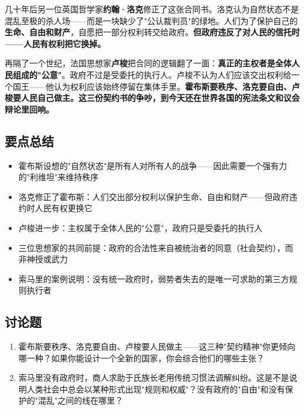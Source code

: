 \documentclass[a4paper,12pt]{ctexart}
\begin{document}
几十年后另一位英国哲学家\textbf{约翰·洛克}修正了这张合同书。洛克认为自然状态不是混乱至极的杀人场——而是一块缺少了"公认裁判员"的绿地。人们为了保护自己的\textbf{生命、自由和财产}，自愿把一部分权利转交给政府。\textbf{但政府违反了对人民的信托时——人民有权利把它换掉。}

再隔了一个世纪，法国思想家\textbf{卢梭}把合同的逻辑翻了一面：\textbf{真正的主权者是全体人民组成的"公意"}。政府不过是受委托的执行人。卢梭不认为人们应该交出权利给一个国王——他认为权利应该始终停留在集体手里。\textbf{霍布斯要秩序、洛克要自由、卢梭要人民自己做主。这三份契约书的争吵，到今天还在世界各国的宪法条文和议会辩论里回响。}


\subsection*{要点总结}
\begin{itemize}
  \item 霍布斯设想的"自然状态"是所有人对所有人的战争——因此需要一个强有力的"利维坦"来维持秩序
  \item 洛克修正了霍布斯：人们交出部分权利以保护生命、自由和财产——但政府违约时人民有权更换它
  \item 卢梭进一步：主权属于全体人民的"公意"，政府只是受委托的执行人
  \item 三位思想家的共同前提：政府的合法性来自被统治者的同意（社会契约），而非神授或武力
  \item 索马里的案例说明：没有统一政府时，弱势者失去的是唯一可求助的第三方规则执行者
\end{itemize}

\subsection*{讨论题}
\begin{enumerate}
  \item 霍布斯要秩序、洛克要自由、卢梭要人民做主——这三种"契约精神"你更倾向哪一种？如果你能设计一个全新的国家，你会综合他们的哪些主张？
  \item 索马里没有政府时，商人求助于氏族长老用传统习惯法调解纠纷。这是不是说明人类社会中总会以某种形式出现"规则和权威"？没有政府的"自由"和没有保护的"混乱"之间的线在哪里？
\end{enumerate}
\end{document}
